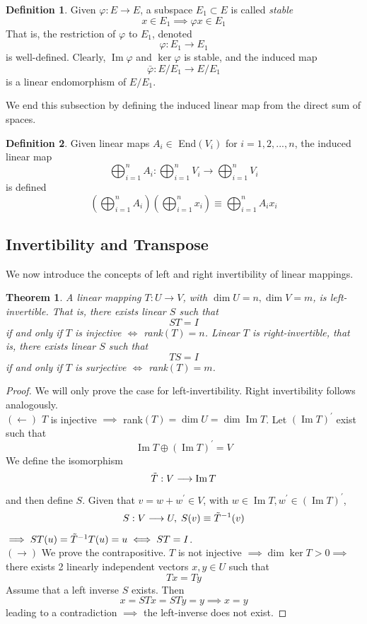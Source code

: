 \documentclass{article}
\DeclareMathOperator{\im}{Im}
\newtheorem{theorem}{Theorem}[section]
\theoremstyle{remark}
\theoremstyle{definition}
\newtheorem{definition}{Definition}[section]
\begin{document}
\begin{definition}
Given $\varphi: E \longrightarrow E$, a subspace $E_1 \subset E$ is called \textit{stable} 
\[x \in E_1 \implies \varphi x \in E_1\]
That is, the restriction of $\varphi$ to $E_1$, denoted
\[\varphi: E_1 \longrightarrow E_1\]
is well-defined. Clearly, $\im{\varphi}$ and $\ker{\varphi}$ is stable, and the induced map 
\[\bar{\varphi}: E / E_1 \longrightarrow E / E_1\]
is a linear endomorphism of $E / E_1$. 
\end{definition}

We end this subsection by defining the induced linear map from the direct sum of spaces. 
\begin{definition}
Given linear maps $A_i \in$ End$(V_i)$ for $i = 1, 2, ..., n$, the induced linear map
\[\bigoplus_{i =1}^n A_i: \bigoplus_{i=1}^n V_i \longrightarrow \bigoplus_{i=1}^n V_i\]
is defined
\[(\bigoplus_{i=1}^n A_i)(\bigoplus_{i=1}^n x_i) \equiv \bigoplus_{i=1}^n A_i x_i\]
\end{definition}

\subsection{Invertibility and Transpose}
We now introduce the concepts of left and right invertibility of linear mappings. 

\begin{theorem}
A linear mapping $T: U \longrightarrow V$, with $\dim{U} = n, \dim{V} = m$, is \textit{left-invertible}. That is, there exists linear $S$ such that 
\[S T = I\]
if and only if $T$ is injective $\iff$ rank$(T) = n$. Linear $T$ is \textit{right-invertible}, that is, there exists linear $S$ such that 
\[T S = I\]
if and only if $T$ is surjective $\iff$ rank$(T) = m$. 
\end{theorem}
\begin{proof}
We will only prove the case for left-invertibility. Right invertibility follows analogously. \\
$(\leftarrow)$ $T$ is injective $\implies$ rank$(T) = \dim{U} = \dim{\im{T}}$. Let $(\im{T})^\prime$ exist such that 
\[\im{T} \oplus (\im{T})^\prime = V\]
We define the isomorphism 
\[\Tilde{T}: V \longrightarrow \im{T}\]
and then define $S$. Given that $v = w + w^\prime \in V$, with $w \in \im{T}, w^\prime \in (\im{T})^\prime$, 
\[S : V \longrightarrow U, \; S(v) \equiv \Tilde{T}^{-1} (v)\]
$\implies S T (u) = \Tilde{T}^{-1} T (u) = u \iff S T = I$. \\
$(\rightarrow)$ We prove the contrapositive. $T$ is not injective $\implies \dim{\ker{T}} > 0 \implies $ there exists 2 linearly independent vectors $x, y \in U$ such that
\[T x = T y\]
Assume that a left inverse $S$ exists. Then 
\[x = S T x = S T y = y \implies x = y\]
leading to a contradiction $\implies$ the left-inverse does not exist. 
\end{proof}
\end{document}
